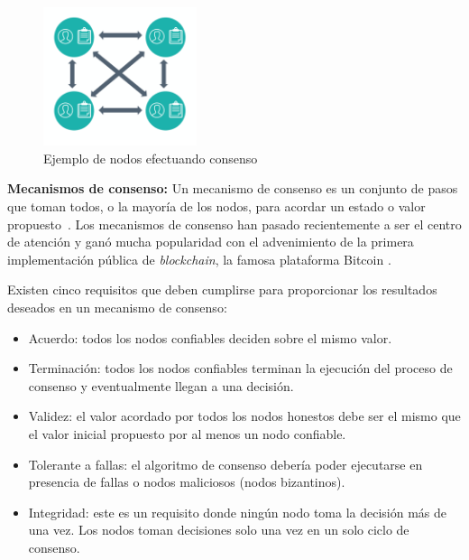 \begin{figure}[h]
    \centering
    \includegraphics[width=0.4\textwidth]{consenso-nodos.png}
     \caption{Ejemplo de nodos efectuando consenso}
    \label{blockchain_consensus}
\end{figure}

\textbf{Mecanismos de consenso:}  Un mecanismo de consenso es un conjunto de pasos que toman todos, o la mayoría de los nodos, para acordar un estado o valor propuesto~\cite{swanson2015consensus}. Los mecanismos de consenso han pasado recientemente a ser el centro de atención y ganó mucha popularidad con el advenimiento de la primera implementación pública de \textit{blockchain}, la famosa plataforma Bitcoin \cite{nakamoto2008bitcoin}.

Existen cinco requisitos que deben cumplirse para proporcionar los resultados deseados en un mecanismo de consenso:

\begin{itemize}
\item Acuerdo: todos los nodos confiables deciden sobre el mismo valor.
\item Terminación: todos los nodos confiables terminan la ejecución del proceso de consenso y eventualmente llegan a una decisión.
\item Validez: el valor acordado por todos los nodos honestos debe ser el mismo que el valor inicial propuesto por al menos un nodo confiable.
\item Tolerante a fallas: el algoritmo de consenso debería poder ejecutarse en presencia de fallas o nodos maliciosos (nodos bizantinos).
\item Integridad: este es un requisito donde ningún nodo toma la decisión más de una vez. Los nodos toman decisiones solo una vez en un solo ciclo de consenso.
\end{itemize}

